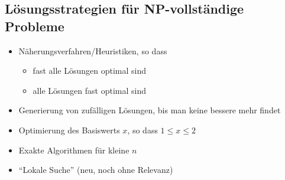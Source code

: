 \subsection{Lösungsstrategien für NP-vollständige Probleme}
\begin{itemize}\itemsep0em
	\item Näherungsverfahren/Heuristiken, so dass 
	\begin{itemize}\itemsep0em
		\item fast alle Lösungen optimal sind
		\item alle Lösungen fast optimal sind
	\end{itemize}
	\item Generierung von zufälligen Lösungen, bis man keine bessere mehr findet
	\item Optimierung des Basiswerts $x$, so dass $1 \leq x \leq 2$
	\item Exakte Algorithmen für kleine $n$
	\item \enquote{Lokale Suche} (neu, noch ohne Relevanz)
\end{itemize}

